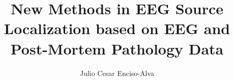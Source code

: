 \documentclass[12pt]{report}\usepackage{utathesis,amsmath,amsthm,amssymb,listings,color,graphicx,float,enumitem,algorithm,algpseudocode,oldgerm,mathrsfs,microtype,geometry,latexsym,xpatch,etoolbox,tikz,bm}%
\begin{document}
    
       \author{Julio Cesar Enciso-Alva}
       \title{New Methods in EEG Source Localization based on EEG and Post-Mortem Pathology Data}



          \titlepage



         \copyrightpage



\newpage

\begin{acknowledgements}



\end{acknowledgements}
\begin{abstract}
	
	\indent
\end{abstract}
\end{document}
